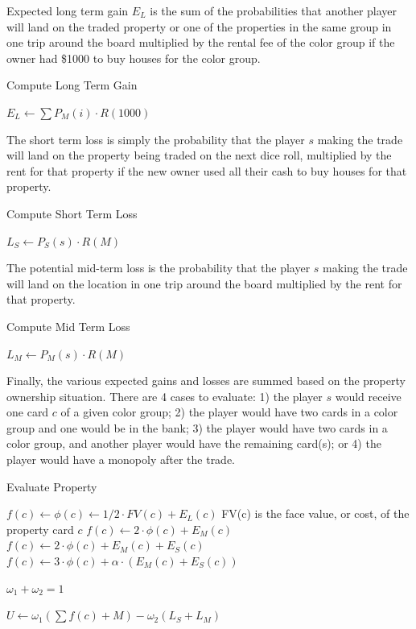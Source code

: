 Expected long term gain \(E_L\) is the sum of the probabilities that another
player will land on the traded property or one of the properties in the same group in
one trip around the board multiplied by the rental fee of the color group if the
owner had \$1000 to buy houses for the color group.
\begin{algorithm} 
\caption{Compute Long Term Gain}
\label{alg_ltg}
\begin{algorithmic}
   \STATE $E_L \gets \sum P_M(i) \cdot R(1000)$ 
\end{algorithmic}
\end{algorithm}

The short term loss is simply the probability that the player \(s\) making the
trade will land on the property being traded on the next dice roll, multiplied by the
rent for that property if the new owner used all their cash to buy houses for
that property.
\begin{algorithm} 
\caption{Compute Short Term Loss}
\label{alg_stl}
\begin{algorithmic}
   \STATE $L_S \gets P_S(s) \cdot R(M)$ 
\end{algorithmic}
\end{algorithm}

The potential mid-term loss is the probability that the player \(s\) making the
trade will land on the location in one trip around the board multiplied by the rent
for that property.
\begin{algorithm} 
\caption{Compute Mid Term Loss}
\label{alg_mtl}
\begin{algorithmic}
   \STATE $L_M \gets P_M(s) \cdot R(M)$ 
\end{algorithmic}
\end{algorithm}

Finally, the various expected gains and losses are summed based on the property
ownership situation. There are 4 cases to evaluate: 1) the player \(s\) would
receive one card \(c\) of a given color group; 2) the player would have two
cards in a color group and one would be in the bank; 3) the player would have
two cards in a color group, and another player would have the remaining card(s);
or 4) the player would have a monopoly after the trade.
\begin{algorithm} 
\caption{Evaluate Property}
\label{alg_bigU}
\begin{algorithmic}
    \STATE $f(c) \gets \phi(c) \gets 1/2 \cdot FV(c) + E_L(c)$
    \COMMENT FV(c) is the face value, or cost, of the property card \(c\)
  \ENDIF
    \STATE $f(c) \gets 2 \cdot \phi(c) + E_M(c)$
  \ENDIF
    \STATE $f(c) \gets 2 \cdot \phi(c) + E_M(c) + E_S(c)$
  \ENDIF
    \STATE $f(c) \gets 3 \cdot \phi(c) + \alpha \cdot (E_M(c) + E_S(c))$
  \ENDIF

  \REQUIRE $\omega_1 + \omega_2 = 1$

  $U \gets \omega_1(\sum f(c) + M) - \omega_2(L_S + L_M)$
\end{algorithmic}
\end{algorithm}

